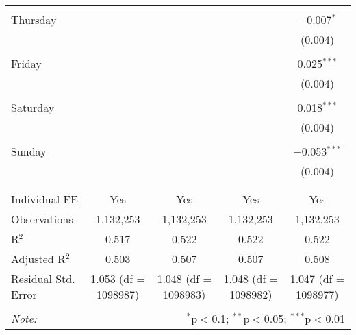 \documentclass[
]{article}
\begin{document}
\begin{table}[!htbp]
{\begin{tabular}{@{\extracolsep{5pt}}lcccc}
  & & & & \\ 
 Thursday &  &  &  & $-$0.007$^{*}$ \\ 
  &  &  &  & (0.004) \\ 
  & & & & \\ 
 Friday &  &  &  & 0.025$^{***}$ \\ 
  &  &  &  & (0.004) \\ 
  & & & & \\ 
 Saturday &  &  &  & 0.018$^{***}$ \\ 
  &  &  &  & (0.004) \\ 
  & & & & \\ 
 Sunday &  &  &  & $-$0.053$^{***}$ \\ 
  &  &  &  & (0.004) \\ 
  & & & & \\ 
\hline \\[-1.8ex] 
Individual FE & Yes & Yes & Yes & Yes \\ 
Observations & 1,132,253 & 1,132,253 & 1,132,253 & 1,132,253 \\ 
R$^{2}$ & 0.517 & 0.522 & 0.522 & 0.522 \\ 
Adjusted R$^{2}$ & 0.503 & 0.507 & 0.507 & 0.508 \\ 
Residual Std. Error & 1.053 (df = 1098987) & 1.048 (df = 1098983) & 1.048 (df = 1098982) & 1.047 (df = 1098977) \\ 
\hline 
\hline \\[-1.8ex] 
\textit{Note:}  & \multicolumn{4}{r}{$^{*}$p$<$0.1; $^{**}$p$<$0.05; $^{***}$p$<$0.01} \\ 
\end{tabular}
} 
\end{table} 
\newpage
\end{document}
